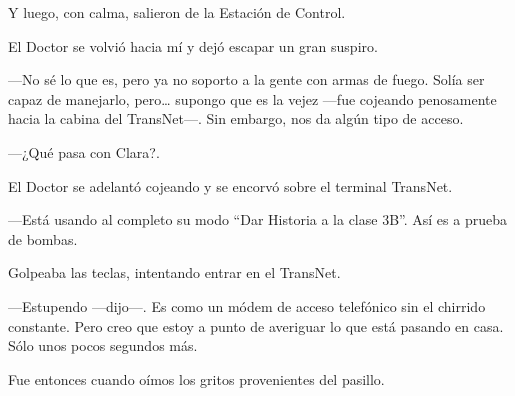 Y luego, con calma, salieron de la Estación de Control.

El Doctor se volvió hacia mí y dejó escapar un gran suspiro.

---No sé lo que es, pero ya no soporto a la gente con armas de fuego.
Solía ser capaz de manejarlo, pero\ldots{} supongo que es la vejez
---fue cojeando penosamente hacia la cabina del TransNet---. Sin
embargo, nos da algún tipo de acceso.

---¿Qué pasa con Clara?.

El Doctor se adelantó cojeando y se encorvó sobre el terminal TransNet.

---Está usando al completo su modo ``Dar Historia a la clase 3B''. Así
es a prueba de bombas.

Golpeaba las teclas, intentando entrar en el TransNet.

---Estupendo ---dijo---. Es como un módem de acceso telefónico sin el
chirrido constante. Pero creo que estoy a punto de averiguar lo que está
pasando en casa. Sólo unos pocos segundos más.

Fue entonces cuando oímos los gritos provenientes del pasillo.
